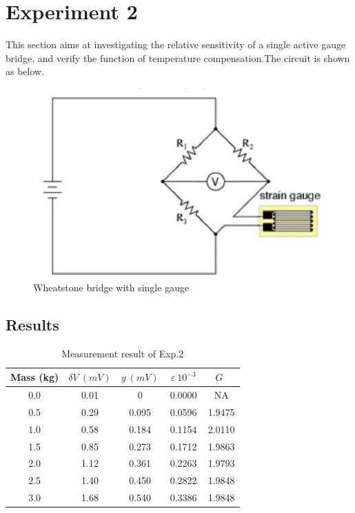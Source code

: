 \documentclass[11pt,a4paper,twoside]{article}
\begin{document}
\section{Experiment 2}
This section aims at investigating the relative sensitivity of a single active gauge bridge, and verify the function of temperature compensation.The circuit is shown as below. 

\begin{figure}[!h]
	\centering
	\includegraphics[width=0.5\linewidth]{3}
	\caption{Wheatstone bridge with single gauge}
	\label{f3}
\end{figure}

\subsection{Results}

\begin{table}[!h]
	\centering
	\begin{tabular}{|c|c|c|c|c|}
		\hline
		Mass (kg) & $\delta V \ (mV)$ & $y\ (mV)$ & $\ \varepsilon \ 10^{-3} \ $ & $ G \ \ $  \\
		\hline\hline
		0.0 & 0.01 & 0 & 0.0000 & NA\\
		\hline
		0.5 & 0.29 & 0.095 &0.0596 & 1.9475\\
		\hline
		1.0 & 0.58 & 0.184 &0.1154 &2.0110\\
		\hline
		1.5 & 0.85 & 0.273 &0.1712 &1.9863\\
		\hline
		2.0 & 1.12 & 0.361 &0.2263 &1.9793\\
		\hline
		2.5 & 1.40 & 0.450 &0.2822 &1.9848\\
		\hline
		3.0 & 1.68 & 0.540 &0.3386 &1.9848\\
		\hline
	
	\end{tabular}
	\caption{Measurement result of Exp.2}
	\label{t2}
\end{table}
\end{document}
